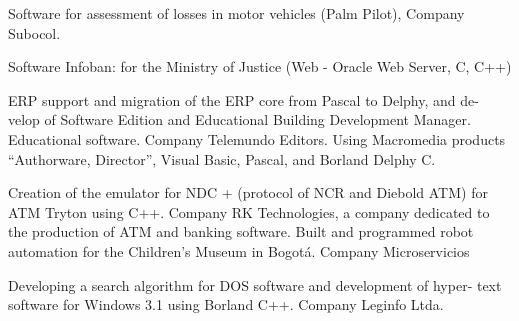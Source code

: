 \begin{entrylist}
{Software for assessment of losses in motor vehicles (Palm Pilot), Company
Subocol.

Software Infoban: for the Ministry of Justice (Web - Oracle Web Server, C,
C++)

ERP support and migration of the ERP core from Pascal to Delphy, and de-
velop of Software Edition and Educational Building Development Manager.
Educational software. Company Telemundo Editors. Using Macromedia
products “Authorware, Director”, Visual Basic, Pascal, and Borland Delphy
C.

Creation of the emulator for NDC + (protocol of NCR and Diebold ATM) for
ATM Tryton using C++. Company RK Technologies, a company dedicated to
the production of ATM and banking software.
Built and programmed robot automation for the Children’s Museum in Bogotá.
Company Microservicios

Developing a search algorithm for DOS software and development of hyper-
text software for Windows 3.1 using Borland C++. Company Leginfo Ltda.}

  \end{entrylist}

